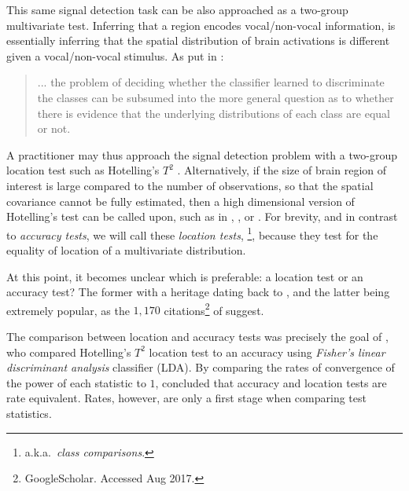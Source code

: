 \documentclass[12pt,a4paper]{article}
\begin{document}
This same signal detection task can be also approached as a two-group multivariate test.
Inferring that a region encodes vocal/non-vocal information, is essentially inferring that the spatial distribution of brain activations is different given a vocal/non-vocal stimulus. 
As put in \cite{pereira_machine_2009}: 
\begin{quote}
... the problem of deciding whether the classifier learned to discriminate the classes can be subsumed into the more general question as to whether there is evidence that the underlying distributions of each class are equal or not.
\end{quote}
A practitioner may thus approach the signal detection problem with a two-group location test such as Hotelling's $T^2$ \citep{anderson_introduction_2003}.
Alternatively, if the size of brain region of interest is large compared to the number of observations, so that the spatial covariance cannot be fully estimated, then a high dimensional version of Hotelling's test can be called upon, such as in \cite{schafer_shrinkage_2005}, \cite{goeman2006testing}, or \cite{srivastava_multivariate_2007} .
For brevity, and in contrast to \emph{accuracy tests}, we will call these \emph{location tests}, \footnote{a.k.a.\ \emph{class comparisons}.}, because they test for the equality of location of a multivariate distribution. 


At this point, it becomes unclear which is preferable: a location test or an accuracy test?
The former with a heritage dating back to \cite{hotelling_generalization_1931}, and the latter being extremely popular, as the $1,170$ citations\footnote{GoogleScholar. Accessed Aug 2017.} of \cite{kriegeskorte_information-based_2006} suggest. 

The comparison between location and accuracy tests was precisely the goal of \cite{ramdas_classification_2016}, who compared Hotelling's $T^2$ location test to an accuracy using \emph{Fisher's linear discriminant analysis} classifier (LDA). 
By comparing the rates of convergence of the power of each statistic to $1$, \cite{ramdas_classification_2016} concluded that accuracy and location tests are rate equivalent. 
Rates, however, are only a first stage when comparing test statistics. 
\end{document}
